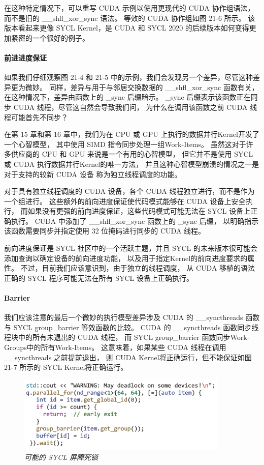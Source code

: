 在这种特定情况下，可以重写 CUDA 示例以使用更现代的 CUDA 协作组语法，
而不是旧的 \_\_shfl\_xor\_sync 语法。 等效的 CUDA 协作组如图 21-6 所示。 
该版本看起来更像 SYCL Kernel，是 CUDA 和 SYCL 2020 的后续版本如何变得更加紧密的一个很好的例子。

\paragraph{前进进度保证}

如果我们仔细观察图 21-4 和 21-5 中的示例，我们会发现另一个差异，尽管这种差异更为微妙。 
同样，差异与用于与邻居交换数据的 \_\_shfl\_xor\_sync 函数有关，
在这种情况下，差异由函数上的 \_sync 后缀暗示。 
\_sync 后缀表示该函数正在同步 CUDA 线程，尽管这自然会导致我们问，
为什么在调用该函数之前 CUDA 线程可能首先不同步？

在第 15 章和第 16 章中，我们为在 CPU 或 GPU 上执行的数据并行Kernel开发了一个心智模型，
其中使用 SIMD 指令同步处理一组Work-Items。 
虽然这对于许多供应商的 CPU 和 GPU 来说是一个有用的心智模型，
但它并不是使用 SYCL 或 CUDA 执行数据并行Kernel的唯一方法，
并且这种心智模型崩溃的情况之一是对于支持的较新 CUDA 设备 称为独立线程调度的功能。

对于具有独立线程调度的 CUDA 设备，各个 CUDA 线程独立进行，而不是作为一个组进行。 
这些额外的前向进度保证使代码模式能够在 CUDA 设备上安全执行，
而如果没有更强的前向进度保证，这些代码模式可能无法在 SYCL 设备上正确执行。 
CUDA 中添加了 \_\_shfl\_xor\_sync 函数上的 \_sync 后缀，
以明确指示该函数需要同步并指定使用 32 位掩码进行同步的 CUDA 线程。

前向进度保证是 SYCL 社区中的一个活跃主题，并且 SYCL 的未来版本很可能会添加查询以确定设备的前向进度功能，
以及用于指定Kernel的前向进度要求的属性。 不过，目前我们应该意识到，由于独立的线程调度，
从 CUDA 移植的语法正确的 SYCL 程序可能无法在所有 SYCL 设备上正确执行。

\paragraph{Barrier}

我们应该注意的最后一个微妙的执行模型差异涉及 CUDA 的 \_\_syncthreads 函数
与 SYCL group\_barrier 等效函数的比较。 
CUDA 的 \_\_syncthreads 函数同步线程块中的所有未退出的 CUDA 线程，
而 SYCL group\_barrier 函数同步Work-Groups中的所有Work-Items。 
这意味着，如果某些 CUDA 线程在调用 \_\_syncthreads 之前提前退出，
则 CUDA Kernel将正确运行，但不能保证如图 21-7 所示的 SYCL Kernel将正确运行。

\begin{figure}[H]
	\centering
	\includegraphics[width=0.9\textwidth]{figs/F21.7.png}
	\caption{\textit{可能的 SYCL 屏障死锁 }}
\end{figure}

